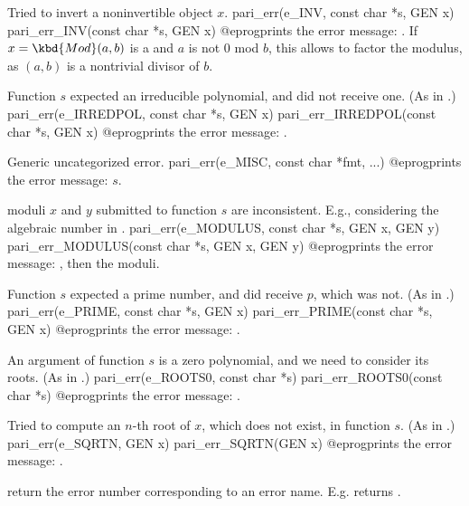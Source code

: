  Tried to invert a noninvertible object $x$.
\bprog
  pari_err(e_INV, const char *s, GEN x)
  pari_err_INV(const char *s, GEN x)
@eprog\noindent prints the error message: .
If $x = \kbd{Mod}(a,b)$ is a  and $a$ is not $0$ mod $b$, this
allows to factor the modulus, as $(a,b)$ is a nontrivial divisor of
$b$.

 Function $s$ expected an irreducible polynomial,
and did not receive one. (As in .)
\bprog
  pari_err(e_IRREDPOL, const char *s, GEN x)
  pari_err_IRREDPOL(const char *s, GEN x)
@eprog\noindent prints the error message: .

 Generic uncategorized error.
\bprog
  pari_err(e_MISC, const char *fmt, ...)
@eprog\noindent prints the error message: $s$.

 moduli $x$ and $y$ submitted to function $s$ are
inconsistent. E.g., considering the algebraic number
 in .
\bprog
  pari_err(e_MODULUS, const char *s, GEN x, GEN y)
  pari_err_MODULUS(const char *s, GEN x, GEN y)
@eprog\noindent prints the error message: ,
then the moduli.

 Function $s$ expected a prime number, and did receive $p$,
which was not. (As in .)
\bprog
  pari_err(e_PRIME, const char *s, GEN x)
  pari_err_PRIME(const char *s, GEN x)
@eprog\noindent prints the error message: .

 An argument of function $s$ is a zero polynomial, and
we need to consider its roots. (As in .)
\bprog
  pari_err(e_ROOTS0, const char *s)
  pari_err_ROOTS0(const char *s)
@eprog\noindent prints the error message: .

 Tried to compute an $n$-th root of $x$, which does not
exist, in function $s$.
(As in .)
\bprog
  pari_err(e_SQRTN, GEN x)
  pari_err_SQRTN(GEN x)
@eprog\noindent prints the error message: .


 return the error number corresponding to
an error name. E.g.  returns .

